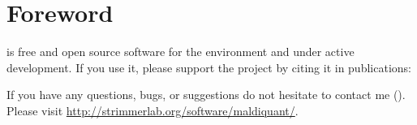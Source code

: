 \section{Foreword}

\Mq{} is free and open source software for the \R{} \citep{RPROJECT}
environment and under active development.
If you use it, please support the project by citing it in publications:

\begin{quote}
\end{quote}

If you have any questions, bugs, or suggestions do not hesitate to contact
me (). \\
Please visit \url{http://strimmerlab.org/software/maldiquant/}.


